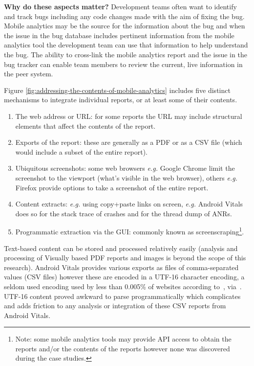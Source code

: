 \textbf{Why do these aspects matter?} 
Development teams often want to identify and track bugs including any code changes made with the aim of fixing the bug. Mobile analytics may be the source for the information about the bug and when the issue in the bug database includes pertinent information from the mobile analytics tool the development team can use that information to help understand the bug. The ability to cross-link the mobile analytics report and the issue in the bug tracker can enable team members to review the current, live information in the peer system. 

Figure \ref{fig:addressing-the-contents-of-mobile-analytics} includes five distinct mechanisms to integrate individual reports, or at least some of their contents.
\begin{enumerate}
    \itemsep0em
    \item The web address or URL: for some reports the URL may include structural elements that affect the contents of the report.
    \item Exports of the report: these are generally as a PDF or as a CSV file (which would include a subset of the entire report).
    \item Ubiquitous screenshots: some web browsers \emph{e.g.} Google Chrome limit the screenshot to the viewport (what's visible in the web browser), others \emph{e.g.} Firefox provide options to take a screenshot of the entire report.
    \item Content extracts: \emph{e.g.} using copy+paste links on screen, \emph{e.g.} Android Vitals does so for the stack trace of crashes and for the thread dump of ANRs.
    \item Programmatic extraction via the GUI: commonly known as screenscraping\footnote{Note: some mobile analytics tools may provide API access to obtain the reports and/or the contents of the reports however none was discovered during the case studies.}. 
\end{enumerate}

Text-based content can be stored and processed relatively easily (analysis and processing of Visually based PDF reports and images is beyond the scope of this research). Android Vitals provides various exports as files of comma-separated values (CSV files) however these are encoded in a UTF-16 character encoding, a seldom used encoding used by less than 0.005\% of websites according to~\citet{w3techs_utf16}, via~\citep{wikipedia_utf16}. UTF-16 content proved awkward to parse programmatically which complicates and adds friction to any analysis or integration of these CSV reports from Android Vitals.

